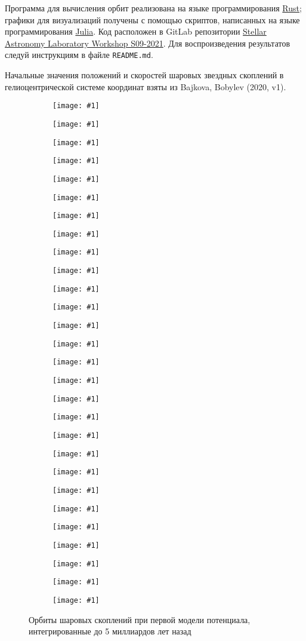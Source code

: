 \documentclass[a4paper, oneside]{article}
\newcommand{\npar}{\par\vspace{\baselineskip}}
\newlength{\imagewidth}
\newlength{\imageheight}
\newcommand{\subgraphics}[1]{
\settowidth{\imagewidth}{\texttt{[image: \#1]}}%
\begin{subfigure}{\imagewidth}%
    \texttt{[image: \#1]}%
\end{subfigure}%
}
\begin{document}
Программа для вычисления орбит реализована на языке программирования \href{https://www.rust-lang.org}{Rust}; графики для визуализаций получены с помощью скриптов, написанных на языке программирования \href{https://julialang.org/}{Julia}. Код расположен в GitLab репозитории \href{https://gitlab.com/paveloom-g/university/s09-2021/stellar-astronomy-laboratory-workshop}{Stellar Astronomy Laboratory Workshop S09-2021}. Для воспроизведения результатов следуй инструкциям в файле {\footnotesize \texttt{README.md}}. \npar

Начальные значения положений и скоростей шаровых звездных скоплений в гелиоцентрической системе координат взяты из Bajkova, Bobylev (2020, v1).

\newpage

\captionsetup{justification=centering}

\begin{figure}[H]
  \setlength{\imageheight}{2.85cm}
  \centering
  \subgraphics{orbits/M1/E 1/E 1 (Orbit, XY)}
  \subgraphics{orbits/M1/E 1/E 1 (Orbit, RZ)}
  \subgraphics{orbits/M1/FSR 1716/FSR 1716 (Orbit, XY)}
  \subgraphics{orbits/M1/FSR 1716/FSR 1716 (Orbit, RZ)}
  \subgraphics{orbits/M1/NGC 104/NGC 104 (Orbit, XY)}
  \subgraphics{orbits/M1/NGC 104/NGC 104 (Orbit, RZ)}
  \subgraphics{orbits/M1/NGC 1851/NGC 1851 (Orbit, XY)}
  \subgraphics{orbits/M1/NGC 1851/NGC 1851 (Orbit, RZ)}
  \subgraphics{orbits/M1/NGC 2419/NGC 2419 (Orbit, XY)}
  \subgraphics{orbits/M1/NGC 2419/NGC 2419 (Orbit, RZ)}
  \subgraphics{orbits/M1/NGC 5927/NGC 5927 (Orbit, XY)}
  \subgraphics{orbits/M1/NGC 5927/NGC 5927 (Orbit, RZ)}
  \subgraphics{orbits/M1/NGC 6284/NGC 6284 (Orbit, XY)}
  \subgraphics{orbits/M1/NGC 6284/NGC 6284 (Orbit, RZ)}
  \subgraphics{orbits/M1/NGC 7078/NGC 7078 (Orbit, XY)}
  \subgraphics{orbits/M1/NGC 7078/NGC 7078 (Orbit, RZ)}
  \subgraphics{orbits/M1/Pal 1/Pal 1 (Orbit, XY)}
  \subgraphics{orbits/M1/Pal 1/Pal 1 (Orbit, RZ)}
  \subgraphics{orbits/M1/Pal 3/Pal 3 (Orbit, XY)}
  \subgraphics{orbits/M1/Pal 3/Pal 3 (Orbit, RZ)}
  \subgraphics{orbits/M1/Pal 4/Pal 4 (Orbit, XY)}
  \subgraphics{orbits/M1/Pal 4/Pal 4 (Orbit, RZ)}
  \subgraphics{orbits/M1/Pal 7/Pal 7 (Orbit, XY)}
  \subgraphics{orbits/M1/Pal 7/Pal 7 (Orbit, RZ)}
  \subgraphics{orbits/M1/Pyxis/Pyxis (Orbit, XY)}
  \subgraphics{orbits/M1/Pyxis/Pyxis (Orbit, RZ)}
  \subgraphics{orbits/M1/Whiting 1/Whiting 1 (Orbit, XY)}
  \subgraphics{orbits/M1/Whiting 1/Whiting 1 (Orbit, RZ)}
  \caption{Орбиты шаровых скоплений при первой модели потенциала, интегрированные до 5 миллиардов лет назад}
\end{figure}
\end{document}
